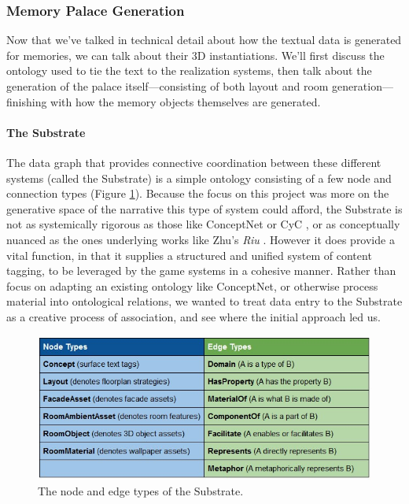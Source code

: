 \subsubsection{Memory Palace Generation}\label{subsubsec:delve-implementation-memory-palace-generation}

Now that we've talked in technical detail about how the textual data is generated for memories, we can talk about their 3D instantiations. We'll first discuss the ontology used to tie the text to the realization systems, then talk about the generation of the palace itself---consisting of both layout and room generation---finishing with how the memory objects themselves are generated.

\paragraph{The Substrate}\label{par:delve-implementation-the-substrate}

The data graph that provides connective coordination between these different systems (called the Substrate) is a simple ontology consisting of a few node and connection types (Figure \ref{fig:substrate-ontology}). Because the focus on this project was more on the generative space of the narrative this type of system could afford, the Substrate is not as systemically rigorous as those like ConceptNet \cite{liu2004conceptnet} or CyC \cite{cyc}, or as conceptually nuanced as the ones underlying works like Zhu's \textit{Riu} \cite{zhu2010story}. However it does provide a vital function, in that it supplies a structured and unified system of content tagging, to be leveraged by the game systems in a cohesive manner. Rather than focus on adapting an existing ontology like ConceptNet, or otherwise process material into ontological relations, we wanted to treat data entry to the Substrate as a creative process of association, and see where the initial approach led us.


\begin{figure}
    \centering
    \includegraphics[width=\textwidth]{figures/4-Delve/substrate-ontology.jpg}
    \caption{The node and edge types of the Substrate.}
    \label{fig:substrate-ontology}
\end{figure}

